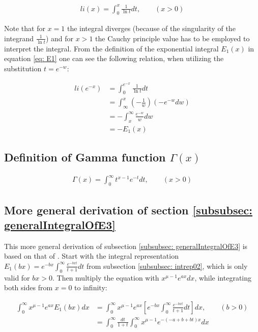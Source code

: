 \documentclass[bibliography=totocnumbered]{scrartcl}
\newcommand{\assume}[1][\text{MISSING PARAMETER}]{,\qquad\left(#1\right)}
\begin{document}
			\begin{gather}
			li\left(x\right)=\int_{0}^{x}\frac{1}{\ln{t}}dt\assume[x>0]\label{eq: li}
			\end{gather}
			
			Note that for $x=1$ the integral diverges (because of the singularity of the integrand $\frac{1}{\ln{t}}$) and for $x>1$ the Cauchy principle value has to be employed to interpret the integral. From the definition of the exponential integral $E_1\left(x\right)$ in equation \eqref{eq: E1} one can see the following relation, when utilizing the substitution $t=e^{-w}$:
			
			\begin{align}
			li\left(e^{-x}\right)&=\int_{0}^{e^{-x}}\frac{1}{\ln{t}}dt\\
			&=\int_{\infty}^{x}\left(-\frac{1}{w}\right)\left(-e^{-w}dw\right)\\
			&=-\int_{x}^{\infty}\frac{e^{-w}}{w}dw\\
			&=-E_1\left(x\right)
			\end{align}
		
		\subsection[Definition of Gamma function]{Definition of Gamma function $\Gamma\left(x\right)$}
		\label{appsubsec: Gamma}
		
			\begin{gather}
			\Gamma\left(x\right)=\int_{0}^{\infty}t^{x-1}e^{-t}dt\assume[x>0]\label{eq: Gamma}
			\end{gather}
		
		\subsection{More general derivation of section \ref{subsubsec: generalIntegralOfE3}}
		\label{appsec: moreGeneralDerivation1}
		
			This more general derivation of subsection \ref{subsubsec: generalIntegralOfE3} is based on that of \autocite[73\psq]{schloemilch}. Start with the integral representation $E_1\left(bx\right)=e^{-bx}\int_{0}^{\infty}\frac{e^{-bxt}}{t+1}dt$ from subsection \ref{subsubsec: intrep02}, which is only valid for $bx>0$. Then multiply the equation with $x^{\mu-1}e^{ax}dx$, while integrating both sides from $x=0$ to infinity:
			
			\begin{align}
			\int_{0}^{\infty}x^{\mu-1}e^{ax}E_1\left(bx\right)dx&=\int_{0}^{\infty}x^{\mu-1}e^{ax}\left[e^{-bx}\int_{0}^{\infty}\frac{e^{-bxt}}{t+1}dt\right]dx\assume[b>0]\\
			&=\int_{0}^{\infty}\frac{dt}{1+t}\int_{0}^{\infty}x^{\mu-1}e^{-\left(-a+b+bt\right)x}dx
			\end{align}
			
\end{document}
